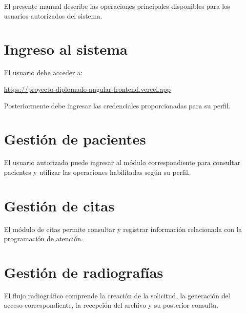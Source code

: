 El presente manual describe las operaciones principales disponibles para
los usuarios autorizados del sistema.

\section*{Ingreso al sistema}

El usuario debe acceder a:

\begin{center}
	\url{https://proyecto-diplomado-angular-frontend.vercel.app}
\end{center}

Posteriormente debe ingresar las credenciales proporcionadas para su perfil.



\section*{Gestión de pacientes}

El usuario autorizado puede ingresar al módulo correspondiente para
consultar pacientes y utilizar las operaciones habilitadas según su perfil.



\section*{Gestión de citas}

El módulo de citas permite consultar y registrar información relacionada
con la programación de atención.



\section*{Gestión de radiografías}

El flujo radiográfico comprende la creación de la solicitud, la generación
del acceso correspondiente, la recepción del archivo y su posterior
consulta.

%



